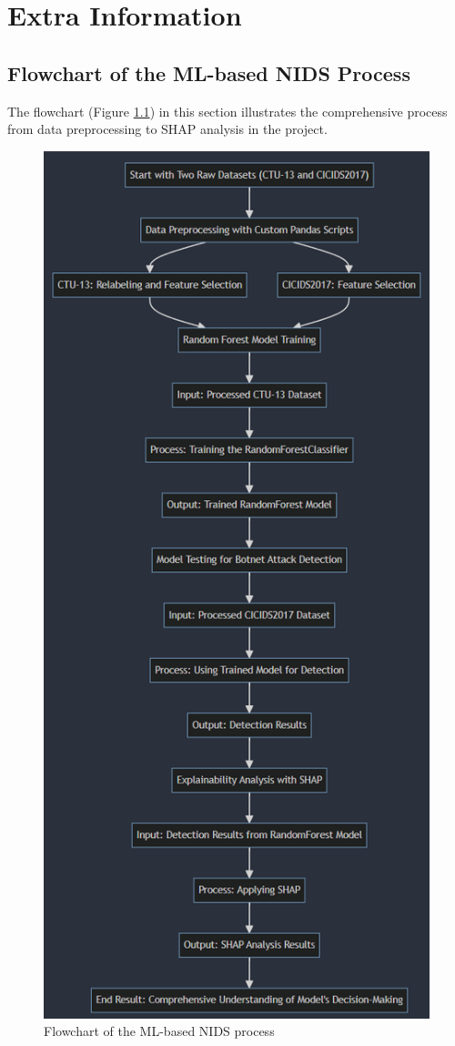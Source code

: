 \chapter{Extra Information}

\section{Flowchart of the ML-based NIDS Process}
The flowchart (Figure \ref{fig:flowchart}) in this section illustrates the comprehensive process from data preprocessing to SHAP analysis in the project.

\begin{figure}
\centering
\includegraphics[scale = 0.6]{img/design_flow.png}
\caption{Flowchart of the ML-based NIDS process}
\label{fig:flowchart}
\end{figure}

